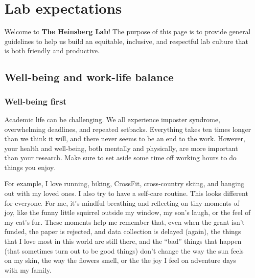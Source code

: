\documentclass[
  letterpaper,
  DIV=11,
  numbers=noendperiod]{scrreprt}
\begin{document}

\chapter*{Lab expectations}\label{lab-expectations}


Welcome to \textbf{The Heinsberg Lab}! The purpose of this page is to
provide general guidelines to help us build an equitable, inclusive, and
respectful lab culture that is both friendly and productive.

\section*{Well-being and work-life
balance}\label{well-being-and-work-life-balance}


\subsection*{Well-being first}\label{well-being-first}

Academic life can be challenging. We all experience imposter syndrome,
overwhelming deadlines, and repeated setbacks. Everything takes ten
times longer than we think it will, and there never seems to be an end
to the work. However, your health and well-being, both mentally and
physically, are more important than your research. Make sure to set
aside some time off working hours to do things you enjoy.

For example, I love running, biking, CrossFit, cross-country skiing, and
hanging out with my loved ones. I also try to have a self-care routine.
This looks different for everyone. For me, it's mindful breathing and
reflecting on tiny moments of joy, like the funny little squirrel
outside my window, my son's laugh, or the feel of my cat's fur. These
moments help me remember that, even when the grant isn't funded, the
paper is rejected, and data collection is delayed (again), the things
that I love most in this world are still there, and the ``bad'' things
that happen (that sometimes turn out to be good things) don't change the
way the sun feels on my skin, the way the flowers smell, or the the joy
I feel on adventure days with my family.
\end{document}

